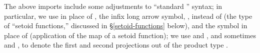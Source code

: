 \begin{code}
\AgdaSpace{}%
\AgdaSpace{}%
\AgdaSpace{}%
\AgdaSpace{}%
\AgdaSpace{}%
\AgdaSpace{}%
\AgdaSpace{}%
\AgdaSpace{}%
\AgdaSpace{}%
\AgdaSymbol{:}\AgdaSpace{}%
\AgdaSpace{}%
\AgdaSymbol{;}%
\>[57]\AgdaSpace{}%
\AgdaSpace{}%
\AgdaSymbol{:}\AgdaSpace{}%
\AgdaSpace{}%
\AgdaSpace{}%
\AgdaSymbol{;}%
\>[80]%
\>[83]\AgdaSymbol{:}\AgdaSpace{}%
\AgdaSpace{}%
\<%
\end{code}

The above imports include some adjustments to ``standard \agda'' syntax; in particular,
we use  in place of , the infix long arrow symbol,
, instead of  (the type of ``setoid functions,'' discussed in §\ref{setoid-functions} below), and the symbol  in place of  (application of the map of a setoid function); we use
 and , and sometimes  and
, to denote the first and second
projections out of the product type
.
\ifshort\else

